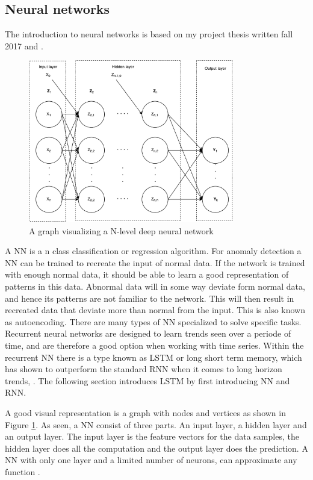     \subsection{Neural networks}
        The introduction to neural networks is based on my project thesis written fall 2017 \cite{myself} and \cite{Hastie}. 
        \begin{figure}[h]
            \centering
            \includegraphics[width=0.8\textwidth]{report/figures/techniques/neural_network.pdf}
            \caption{A graph visualizing a N-level deep neural network}
            \label{fig:nn_fullnetwork}
        \end{figure}
        
        A NN is a n class classification or regression algorithm. For anomaly detection a NN can be trained to recreate the input of normal data. If the network is trained with enough normal data, it should be able to learn a good representation of patterns in this data. Abnormal data will in some way deviate form normal data, and hence its patterns are not familiar to the network. This will then result in recreated data that deviate more than normal from the input. This is also known as autoencoding. There are many types of NN specialized to solve specific tasks. Recurrent neural networks are designed to learn trends seen over a periode of time, and are therefore a good option when working with time series. Within the recurrent NN there is a type known as LSTM or long short term memory, which has shown to outperform the standard RNN when it comes to long horizon trends, \cite{Courville2016}. The following section introduces LSTM by first introducing NN and RNN.  
        
        A good visual representation is a graph with nodes and vertices as shown in Figure \ref{fig:nn_fullnetwork}. As seen, a NN consist of three parts. An input layer, a hidden layer and an output layer. The input layer is the feature vectors for the data samples, the hidden layer does all the computation and the output layer does the prediction. A NN with only one layer and a limited number of neurons, can approximate any function \cite{Hastie}.
        
